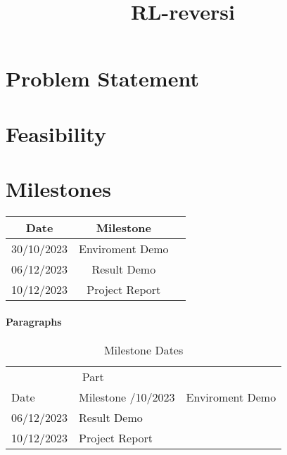 \documentclass{article}
\title{RL-reversi}
\author{%
  Cameron Humphreys\thanks\\
  Student# 101162528\\
  \texttt{CameronHumphreys@cmail.carleton.ca} \\
  \And
  Lauris Petlah\\
  Student# 101156789\\
  \texttt{laurispetlah@cmail.carleton.ca} \\
  \And
  Sukhrobjon Eshmirzaev\\
  Student# 101169793\\
  \texttt{ SukhrobjonEshmirzaev@cmail.carleton.ca} \\
}
\begin{document}
\maketitle


\begin{abstract}

\end{abstract}


\section{Problem Statement}
\label{problem_statement}

\section{Feasibility}
\label{feasibility}



\section{Milestones}
\label{milestones}

\begin{center}
	\begin{tabular}{| c | c | c | }
	\hline
	Date & Milestone\\ 
	\hline	
	30/10/2023 & Enviroment Demo \\
	\hline	
	06/12/2023 & Result Demo \\ 
	\hline
	10/12/2023 & Project Report \\ 
	\hline
	\end{tabular}
	\end{center}
\paragraph{Paragraphs}

\begin{table}
  \caption{Milestone Dates}
  \label{dates-table}
  \centering
  \begin{tabular}{lll}
    \toprule
    \multicolumn{2}{c}{Part}                   \\
    \cmidrule(r){1-2}
    Date     & Milestone
    \midrule
    30/10/2023 & Enviroment Demo               \\
    06/12/2023 & Result Demo                   \\
    10/12/2023 & Project Report                \\
    \bottomrule
  \end{tabular}
\end{table}
\end{document}
